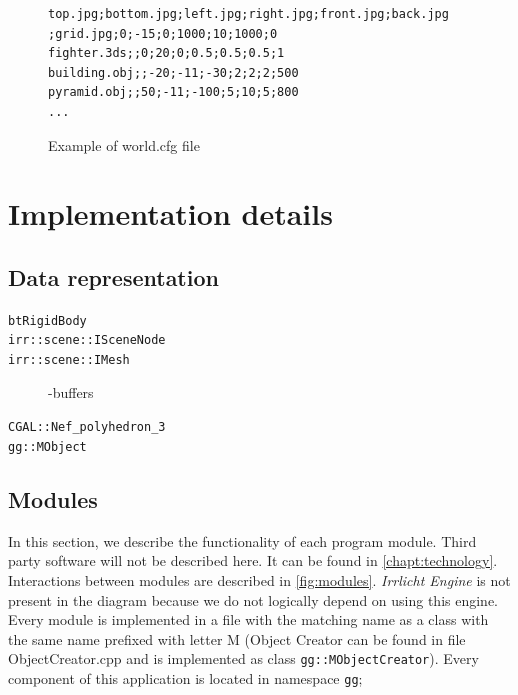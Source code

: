 \begin{figure}
\centering
\begin{Verbatim}[frame=single]
top.jpg;bottom.jpg;left.jpg;right.jpg;front.jpg;back.jpg
;grid.jpg;0;-15;0;1000;10;1000;0
fighter.3ds;;0;20;0;0.5;0.5;0.5;1
building.obj;;-20;-11;-30;2;2;2;500
pyramid.obj;;50;-11;-100;5;10;5;800
...
\end{Verbatim}
\caption{Example of world.cfg file}
\end{figure}





\section*{Implementation details}

\subsection*{Data representation}
\begin{description}
\item [{\tt btRigidBody}]
\item [{\tt irr::scene::ISceneNode}]
\item [{\tt irr::scene::IMesh}] -buffers
\item [{\tt CGAL::Nef\_polyhedron\_3}]
\item [{\tt gg::MObject}]
\end{description}


\subsection*{Modules}
In this section, we describe the functionality of each program module. Third party software will not be described here. It can be found in \cref{chapt:technology}. Interactions between modules are described in \cref{fig:modules}. \emph{Irrlicht Engine} is not present in the diagram because we do not logically depend on using this engine. Every module is implemented in a file with the matching name as a class with the same name prefixed with letter M (Object Creator can be found in file ObjectCreator.cpp and is implemented as class {\tt gg::MObjectCreator}). Every component of this application is located in namespace {\tt gg};

